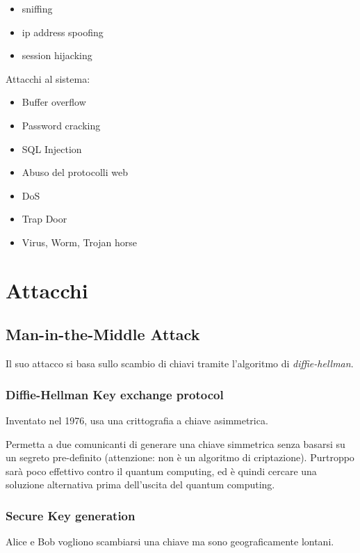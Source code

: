 \begin{itemize}
\item sniffing
\item ip address spoofing
\item session hijacking
\end{itemize}

Attacchi al sistema:

\begin{itemize}
\item Buffer overflow
\item Password cracking
\item SQL Injection
\item Abuso del protocolli web
\item DoS
\item Trap Door
\item Virus, Worm, Trojan horse
\end{itemize}

\section{Attacchi}

\subsection{Man-in-the-Middle Attack}

Il suo attacco si basa sullo scambio di chiavi tramite l'algoritmo di 
\textit{diffie-hellman}.

\subsubsection{Diffie-Hellman Key exchange protocol}

Inventato nel 1976, usa una crittografia a chiave asimmetrica.

Permetta a due comunicanti di generare una chiave simmetrica senza basarsi su 
un segreto pre-definito (attenzione: non è un algoritmo di criptazione). 
Purtroppo sarà poco effettivo contro il quantum computing, ed è quindi cercare 
una soluzione alternativa prima dell'uscita del quantum computing.


\subsubsection{Secure Key generation}

Alice e Bob vogliono scambiarsi una chiave ma sono geograficamente lontani.

